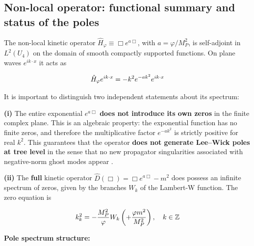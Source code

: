 ﻿\documentclass[11pt,letterpaper]{article}
\begin{document}
\subsection{Non-local operator: functional summary and status of the poles}
The non-local kinetic operator $\hat{H}_\varphi \equiv \Box e^{a\Box}$, with $a = \varphi/M_P^2$, is self-adjoint in $L^2(U_4)$ on the domain of smooth compactly supported functions. On plane waves $e^{ik\cdot x}$ it acts as

\begin{equation*}
  \resizebox{\ifdim\width>\linewidth \linewidth\else\width\fi}{!}{$\displaystyle \hat{H}_\varphi e^{ik\cdot x} = -k^2 e^{-ak^2}e^{ik\cdot x}$}
\end{equation*}

It is important to distinguish two independent statements about its spectrum:

\textbf{(i)} The entire exponential $e^{a\Box}$ \textbf{does not introduce its own zeros} in the finite complex plane. This is an algebraic property: the exponential function has no finite zeros, and therefore the multiplicative factor $e^{-ak^2}$ is strictly positive for real $k^2$. This guarantees that the operator \textbf{does not generate Lee--Wick poles at tree level} in the sense that no new propagator singularities associated with negative-norm ghost modes appear \cite{AnselmiPiva2017a}.

\textbf{(ii)} The \textbf{full} kinetic operator $\hat{D}(\Box) = \Box e^{a\Box} - m^2$ does possess an infinite spectrum of zeros, given by the branches $W_k$ of the Lambert-W function. The zero equation is

\begin{equation*}
  \resizebox{\ifdim\width>\linewidth \linewidth\else\width\fi}{!}{$\displaystyle k_k^2 = -\frac{M_P^2}{\varphi}W_k\left(+\frac{\varphi m^2}{M_P^2}\right), \quad k \in \mathbb{Z}$}
\end{equation*}

\textbf{Pole spectrum structure:}

\begin{table}[htbp]
  \centering
  \small
\end{table}
\end{document}
